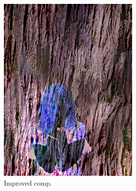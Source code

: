 \begin{figure}[]
\begin{subfigure}{\textwidth}
        \begin{subfigure}{0.24\textwidth}
            \centering
            \includegraphics[width=\textwidth]{images/04-experiment02/human/wood/improved_im.jpg}
            \caption*{Improved comp.}
        \end{subfigure}
        \hfill
        \begin{subfigure}{0.24\textwidth}
            \centering

\end{subfigure}
\end{subfigure}
\end{figure}
